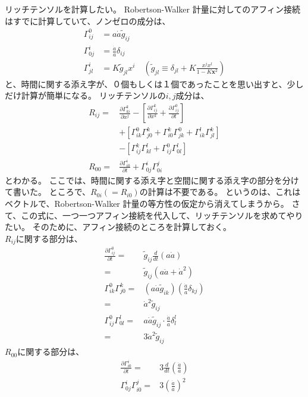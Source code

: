 \documentclass[11pt]{ltjsarticle}
\theoremstyle{plain}
\theoremstyle{break}
\newcommand{\tilg}{\tilde{g}}
\begin{document}
リッチテンソルを計算したい。
Robertson-Walker 計量に対してのアフィン接続はすでに計算していて、ノンゼロの成分は、
\begin{align}
  \Gamma^{0}_{ij} &= a \dot{a} \tilde{g}_{ij} \\
  \Gamma^{i}_{0j} &= \frac{\dot{a}}{a} \delta_{ij} \\
  \Gamma^{i}_{jl} &= K \tilg_{jl} x^i \quad (\tilg_{jl} \equiv \delta_{jl}+K \frac{x^{j} x^{l}}{1-K \mathbf{x}^{2}} ) 
\end{align}
と、時間に関する添え字が、０個もしくは１個であったことを思い出すと、少しだけ計算が簡単になる。
リッチテンソルの$i,j$成分は、
\begin{align}
  R_{i j}=& \frac{\partial \Gamma_{k i}^{k}}{\partial x^{j}}-\left[\frac{\partial \Gamma_{i j}^{k}}{\partial x^{k}}+\frac{\partial \Gamma_{i j}^{0}}{\partial t}\right] \\
  & +\left[\Gamma_{i k}^{0} \Gamma_{j 0}^{k}+\Gamma_{i 0}^{k} \Gamma_{j k}^{0}+\Gamma_{i k}^{l} \Gamma_{j l}^{k}\right] \\
  &-\left[\Gamma_{i j}^{k} \Gamma_{k l}^{l}+\Gamma_{i j}^{0} \Gamma_{0 l}^{l}\right] \\
  R_{00}=&\frac{\partial \Gamma_{i 0}^{i}}{\partial t}+\Gamma_{0 j}^{i} \Gamma_{0 i}^{j}
\end{align}
とわかる。
ここでは、時間に関する添え字と空間に関する添え字の部分を分けて書いた。
ところで、$R_{0 i} ( = R_{i 0})$の計算は不要である。
というのは、これはベクトルで、Robertson-Walker 計量の等方性の仮定から消えてしまうから。
さて、この式に、一つ一つアフィン接続を代入して、リッチテンソルを求めてやりたい。
そのために、アフィン接続のところを計算しておく。\\
$R_{ij}$に関する部分は、
\begin{align}
  \frac{\partial \Gamma_{i j}^{0}}{\partial t}
  	=&\tilde{g}_{i j} \frac{d}{d t}(a \dot{a}) \\
  	=&\tilde{g}_{i j} (a \ddot{a} + \dot{a}^2) \\
   \Gamma^{0}_{i k} \Gamma^{k}_{j0}
   	=& (a \dot{a} \tilde{g}_{ik}) (\frac{\dot{a}}{a} \delta_{kj}) \\
	=& \dot{a}^2 \tilde{g}_{ij}\\
  \Gamma_{i j}^{0} \Gamma_{0 l}^{l}
  	=& a \dot{a} \tilg_{ij} \cdot  \frac{\dot{a}}{a} \delta^{l}_{l} \\
	=&3 \dot{a}^2 \tilg_{ij}
\end{align}
$R_{00}$に関する部分は、
\begin{align}
\frac{\partial \Gamma_{i 0}^{i}}{\partial t}
	=& 3 \frac{d}{d t}\left(\frac{\dot{a}}{a}\right) \\
\Gamma_{0 j}^{i} \Gamma_{i 0}^{j}
	=&3\left(\frac{\dot{a}}{a}\right)^{2}
\end{align}
\end{document}
